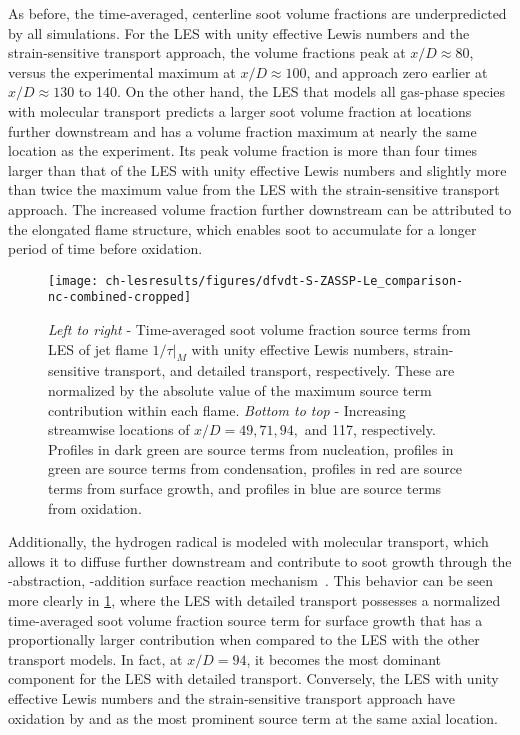 As before, the time-averaged, centerline soot volume fractions are underpredicted by all simulations. For the LES with unity effective Lewis numbers and the strain-sensitive transport approach, the volume fractions peak at $x/D \approx 80$, versus the experimental maximum at $x/D \approx 100$, and approach zero earlier at $x/D \approx 130$ to 140. On the other hand, the LES that models all gas-phase species with molecular transport predicts a larger soot volume fraction at locations further downstream and has a volume fraction maximum at nearly the same location as the experiment. Its peak volume fraction is more than four times larger than that of the LES with unity effective Lewis numbers and slightly more than twice the maximum value from the LES with the strain-sensitive transport approach. The increased volume fraction further downstream can be attributed to the elongated flame structure, which enables soot to accumulate for a longer period of time before oxidation. %

\begin{figure}[H]
  \centering
  \texttt{[image: ch-lesresults/figures/dfvdt-S-ZASSP-Le\_comparison-nc-combined-cropped]}
  \caption[Radial \texorpdfstring{$\langle df_V/dt \rangle/|\langle df_V/dt|_{\text{max}} \rangle|$}{<dfV/dt>/|<dfV/dt>|max|} from LES with Various Transport Approaches]{\textit{Left to right} - Time-averaged soot volume fraction source terms from LES of jet flame $1/\tau|_M$ with unity effective Lewis numbers, strain-sensitive transport, and detailed transport, respectively. These are normalized by the absolute value of the maximum source term contribution within each flame. \textit{Bottom to top} - Increasing streamwise locations of $x/D = 49, 71, 94,$ and 117, respectively. Profiles in dark green are source terms from nucleation, profiles in green are source terms from condensation, profiles in red are source terms from surface growth, and profiles in blue are source terms from oxidation.}
  \label{fig:lesresults:ssta:radialdfvdtf2lecomparison}
\end{figure}

Additionally, the hydrogen radical is modeled with molecular transport, which allows it to diffuse further downstream and contribute to soot growth through the -abstraction, -addition surface reaction mechanism~\cite{frenklach1985,frenklach1991}. This behavior can be seen more clearly in \cref{fig:lesresults:ssta:radialdfvdtf2lecomparison}, where the LES with detailed transport possesses a normalized time-averaged soot volume fraction source term for surface growth that has a proportionally larger contribution when compared to the LES with the other transport models. In fact, at $x/D = 94$, it becomes the most dominant component for the LES with detailed transport. Conversely, the LES with unity effective Lewis numbers and the strain-sensitive transport approach have oxidation by  and  as the most prominent source term at the same axial location.

